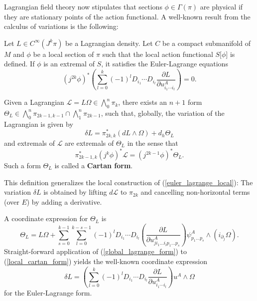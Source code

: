 Lagrangian field theory now stipulates that sections $\phi\in\Gamma(\pi)$ are physical if they are stationary points of the action functional. A well-known result from the calculus of variations is the following:
\begin{proposition}
  Let $L\in C^\infty(J^k\pi)$ be a Lagrangian density. Let $C$ be a compact submanifold of $M$ and $\phi$ be a local section of $\pi$ such that the local action functional $S\lbrack\phi\rbrack$ is defined. If $\phi$ is an extremal of $S$, it satisfies the Euler-Lagrange equations
  \begin{equation}\label{euler_lagrange_local}
    (j^{2k}\phi)^\ast\left( \sum_{l=0}^{k} (-1)^l D_{i_1} \cdots D_{i_l} \frac{\partial L}{\partial u^A_{i_1\cdots i_l}}\right) = 0.
  \end{equation}
\end{proposition}

\begin{proposition}
  Given a Lagrangian $\mathcal L = L\Omega \in \bigwedge^n_0\pi_k$, there exists an $n+1$ form $\Theta_L\in\bigwedge^{n}_0\pi_{2k-1,k-1}\cap\bigwedge^{n}_{1}\pi_{2k-1}$, such that, globally, the variation of the Lagrangian is given by
  \begin{equation}\label{global_lagrange_form}
    \delta L = \pi^\ast_{2k,k} \left( dL\wedge\Omega\right) + d_h \Theta_L
  \end{equation}
  and extremals of $\mathcal L$ are extremals of $\Theta_L$ in the sense that
  \begin{equation}
    \pi_{2k-1,k}^\ast (j^k\phi)^\ast\mathcal L = (j^{2k-1}\phi)^\ast\Theta_L.
  \end{equation}
  Such a form $\Theta_L$ is called a \textbf{Cartan form}.
\end{proposition}

This definition generalizes the local construction of (\ref{euler_lagrange_local}): The variation $\delta L$ is obtained by lifting $d\mathcal L$ to $\pi_{2k}$ and cancelling non-horizontal terms (over $E$) by adding a derivative.

A coordinate expression for $\Theta_L$ is
\begin{equation}\label{local_cartan_form}
  \Theta_L = L\Omega + \sum_{s=0}^{k-1} \sum_{l=0}^{k-s-1} (-1)^l D_{i_1} \cdots D_{i_l} \left(\frac{\partial L}{\partial u^A_{j i_1 \dots i_{l} p_1 \dots p_s}}\right) \psi^A_{p_1\dots p_s} \wedge \left(i_{\partial_j}\Omega\right).
\end{equation}
Straight-forward application of (\ref{global_lagrange_form}) to (\ref{local_cartan_form}) yields the well-known coordinate expression
\begin{equation}
  \delta L = \left( \sum_{l=0}^{k} (-1)^l D_{i_1} \cdots D_{i_l} \frac{\partial L}{\partial u^A_{i_1\cdots i_l}}\right) u^A \wedge \Omega
\end{equation}
for the Euler-Lagrange form.

